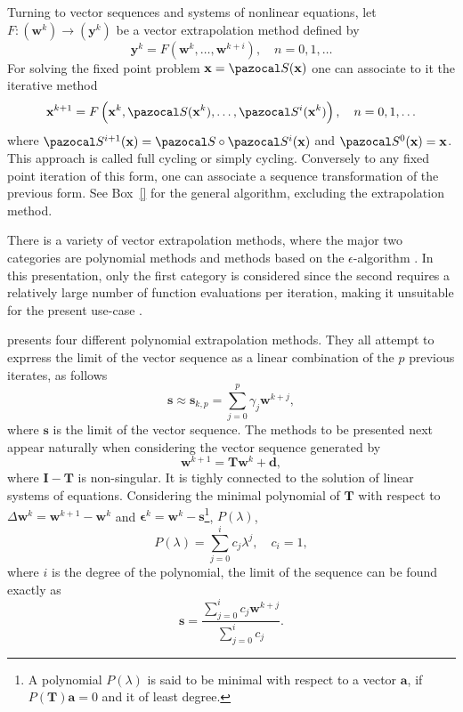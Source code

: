 Turning to vector sequences and systems of nonlinear equations, let \(F:(\mathbf w^{k}) \to(\mathbf y^{k})\) be a vector extrapolation method defined by
\begin{equation}
\mathbf y^k = F\left(\mathbf w^{k}, \ldots, \mathbf w^{k+i}\right), \quad n=0,1, \ldots
\end{equation}
For solving the fixed point problem \(\mathbf x=\pazocal S(\mathbf x)\) one can associate to it the iterative method
\begin{equation}
\mathbf x^{k+1}=F\left(\mathbf x^{k}, \pazocal S(\mathbf x^{k}), \ldots, \pazocal S^{i}(\mathbf x^{k})\right), \quad n=0,1, \ldots
\end{equation}
where \(\pazocal S^{i+1}(\mathbf x)=\pazocal S \circ \pazocal S^{i}(\mathbf x)\) and \(\pazocal S^{0}(\mathbf x)=\mathbf x\).
This approach is called full cycling or simply cycling.
Conversely to any fixed point iteration of this form, one can associate a sequence transformation of the previous form.
See Box~\ref{} for the general algorithm, excluding the extrapolation method.

There is a variety of vector extrapolation methods, where the major two categories are polynomial methods and methods based on the \(\epsilon\)-algorithm \citep{brezinski_extrapolation_2013, sidi_vector_2017}.
In this presentation, only the first category is considered since the second requires a relatively large number of function evaluations per iteration, making it unsuitable for the present use-case \citep{sidi_vector_2017}.

\cite{sidi_vector_2017} presents four different polynomial extrapolation methods.
They all attempt to exprress the limit of the vector sequence as a linear combination of the \(p\) previous iterates, as follows
\begin{equation}
\mathbf s \approx \mathbf{s}_{k, p}=\sum_{j=0}^{p} \gamma_{j} \mathbf w^{k+j},
\end{equation}
where \(\mathbf s\) is the limit of the vector sequence.
The methods to be presented next appear naturally when considering the vector sequence generated by
\begin{equation}
  \mathbf w^{k+1} = \mathbf{T}\mathbf w^k +\mathbf d,
\end{equation}
where \(\mathbf I - \mathbf T\) is non-singular.
It is tighly connected to the solution of linear systems of equations.
Considering the minimal polynomial of \(\mathbf T\) with respect to \(\Delta \mathbf w^{k} = \mathbf w^{k+1} -\mathbf w^k\) and \(\boldsymbol \epsilon^k = \mathbf w^k - \mathbf s\)\footnote{A polynomial \(P(\lambda)\) is said to be minimal with respect to a vector \(\mathbf a\), if \(P(\mathbf T) \mathbf a = 0\) and it of least degree.}, \(P(\lambda)\),
\begin{equation}
  P(\lambda ) = \sum_{j=0}^i c_j \lambda^j, \quad c_i=1,
\end{equation}
where \(i\) is the degree of the polynomial, the limit of the sequence can be found exactly as
\begin{equation}
  \mathbf s = \frac{ \sum_{j=0}^i c_j \mathbf w^{k+j}}{ \sum_{j=0}^i c_j}.
\end{equation}

